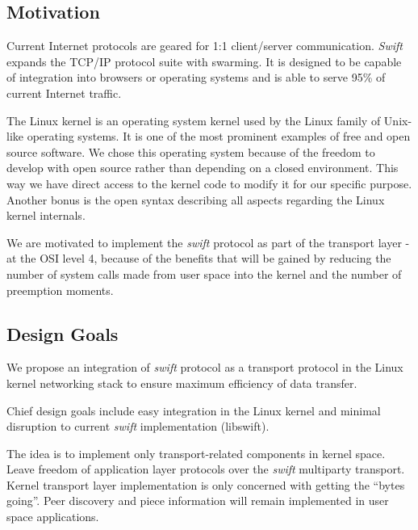 
\subsection{Motivation}

Current Internet protocols are geared for 1:1 client/server communication. \emph{Swift} expands the TCP/IP protocol
suite with swarming. It is designed to be capable of integration into browsers or operating systems and is
able to serve 95\% of current Internet traffic.

The Linux kernel is an operating system kernel used by the Linux family of Unix-like operating systems. It is one of
the most prominent examples of free and open source software. We chose this operating system because of the freedom 
to develop with open source rather than depending on a closed environment. This way we have direct access to the kernel
code to modify it for our specific purpose. Another bonus is the open syntax describing all aspects regarding the
Linux kernel internals. 

We are motivated to implement the \emph{swift} protocol as part of the transport layer - at the OSI level 4, because of
the benefits that will be gained by reducing the number of system calls made from user space into the kernel and
the number of preemption moments.

\subsection{Design Goals}

We propose an integration of \emph{swift} protocol as a transport protocol in the Linux kernel networking stack to 
ensure maximum efficiency of data transfer.

Chief design goals include easy integration in the Linux kernel and minimal disruption to current \emph{swift} 
implementation (libswift). 

The idea is to implement only transport-related components in kernel space. Leave freedom of application layer 
protocols over the \emph{swift} multiparty transport. Kernel transport layer implementation is only concerned with
getting the “bytes going”. Peer discovery and piece information will remain implemented in user 
space applications.

